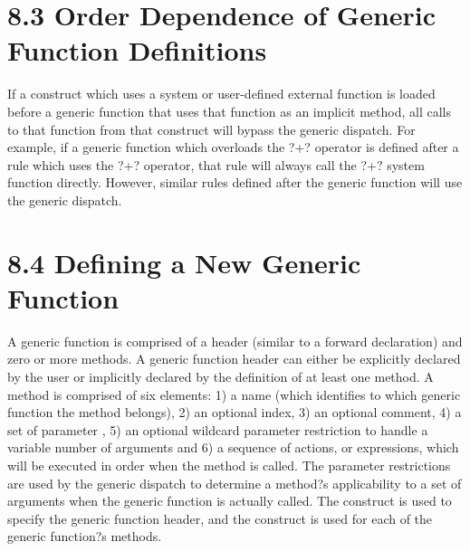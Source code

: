 \documentclass[letterpaper,10pt,english]{sphinxmanual}
\begin{document}
\section{8.3 Order Dependence of Generic Function Definitions}
\label{\detokenize{generic:order-dependence-of-generic-function-definitions}}
If a construct which uses a system or user-defined external function is
loaded before a generic function that uses that function as an implicit
method, all calls to that function from that construct will bypass the
generic dispatch. For example, if a generic function which overloads the
?+? operator is defined after a rule which uses the ?+? operator, that
rule will always call the ?+? system function directly. However, similar
rules defined after the generic function will use the generic dispatch.


\section{8.4 Defining a New Generic Function}
\label{\detokenize{generic:defining-a-new-generic-function}}
A generic function is comprised of a header (similar to a forward
declaration) and zero or more methods. A generic function header can
either be explicitly declared by the user or implicitly declared by the
definition of at least one method. A method is comprised of six
elements: 1) a name (which identifies to which generic function the
method belongs), 2) an optional index, 3) an optional comment, 4) a set
of parameter , 5) an optional wildcard parameter
restriction to handle a variable number of arguments and 6) a sequence
of actions, or expressions, which will be executed in order when the
method is called. The parameter restrictions are used by the generic
dispatch to determine a method?s applicability to a set of arguments
when the generic function is actually called. The 
construct is used to specify the generic function header, and the
 construct is used for each of the generic function?s
methods.

\end{document}
